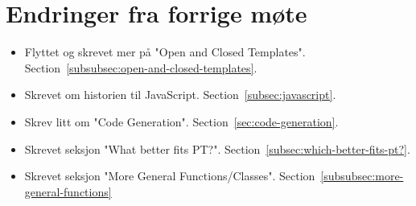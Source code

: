
\chapter*{Endringer fra forrige møte}

\begin{itemize}
    \item Flyttet og skrevet mer på "Open and Closed Templates".
    Section~\vref{subsubsec:open-and-closed-templates}.
    \item Skrevet om historien til JavaScript.
    Section~\vref{subsec:javascript}.
    \item Skrev litt om "Code Generation".
    Section~\vref{sec:code-generation}.
    \item Skrevet seksjon "What better fits PT?".
    Section~\vref{subsec:which-better-fits-pt?}.
    \item Skrevet seksjon "More General Functions/Classes".
    Section~\vref{subsubsec:more-general-functions}
\end{itemize}

